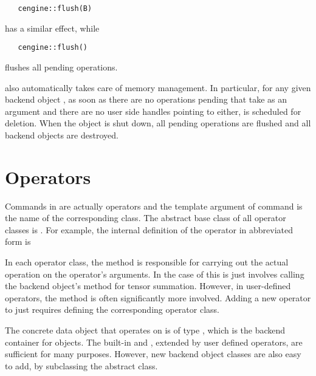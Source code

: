 \texttt{~~~cengine::flush(B)}

has a similar effect, while 

\texttt{~~~cengine::flush()}

flushes all pending operations.  

\Cengine{} also automatically takes care of memory management. In particular, 
for any given backend object , as soon as there are no operations pending that take  
as an argument and there are no user side handles pointing to  either, 
 is scheduled for deletion. When the  object is shut down, all pending 
operations are flushed and all backend objects are destroyed. 

\section*{Operators}

Commands in \Cengine{} are actually operators and the template argument of  
command is the name of the corresponding class. The abstract base class of all 
operator classes is .  
For example, the internal definition of the  operator in abbreviated form is 

\mbox{} 

In each operator class, the  method is responsible for carrying out the actual operation on 
the operator's arguments. In the case of  this is  
just involves calling the backend object's method for tensor summation. 
However, in user-defined operators, the  method is often significantly more involved. 
Adding a new operator to \Cengine{} just requires defining the corresponding operator class. 

The concrete data object that  operates on is of type , 
which is the backend container for  objects. 
The built-in  and , extended by user defined operators, 
are sufficient for many purposes. However, new backend object classes are also easy to add, 
by subclassing the  abstract class. 



 
